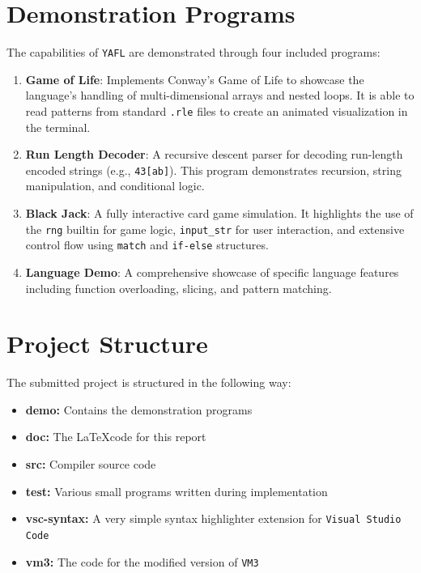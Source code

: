 \documentclass[11pt,a4paper]{article}
\begin{document}
\section{Demonstration Programs}

The capabilities of \texttt{YAFL} are demonstrated through four included programs:
\begin{enumerate}
    \item \textbf{Game of Life}: Implements Conway's Game of Life to showcase the language's handling of multi-dimensional arrays and nested loops. It is able to read patterns from standard \texttt{.rle} files to create an animated visualization in the terminal.
    \item \textbf{Run Length Decoder}: A recursive descent parser for decoding run-length encoded strings (e.g., \texttt{43[ab]}). This program demonstrates recursion, string manipulation, and conditional logic.
    \item \textbf{Black Jack}: A fully interactive card game simulation. It highlights the use of the \texttt{rng} builtin for game logic, \texttt{input\_str} for user interaction, and extensive control flow using \texttt{match} and \texttt{if-else} structures.
    \item \textbf{Language Demo}: A comprehensive showcase of specific language features including function overloading, slicing, and pattern matching.
\end{enumerate}

\appendix

\section{Project Structure}

The submitted project is structured in the following way:
\begin{itemize}
    \item \textbf{demo:} Contains the demonstration programs
    \item \textbf{doc:} The \LaTeX\space code for this report
    \item \textbf{src:} Compiler source code
    \item \textbf{test:} Various small programs written during implementation
    \item \textbf{vsc-syntax:} A very simple syntax highlighter extension for \texttt{Visual Studio Code}
    \item \textbf{vm3:} The code for the modified version of \texttt{VM3}
\end{itemize}
\end{document}
